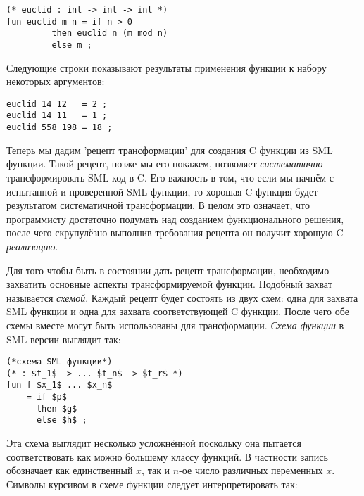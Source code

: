 \begin{lstlisting}[style=customml]
(* euclid : int -> int -> int *)
fun euclid m n = if n > 0
		 then euclid n (m mod n)
		 else m ;
\end{lstlisting}

Следующие строки показывают результаты применения функции  к набору некоторых аргументов:

\begin{lstlisting}[style=customml]
euclid 14 12   = 2 ;
euclid 14 11   = 1 ;
euclid 558 198 = 18 ;
\end{lstlisting}

Теперь мы дадим 'рецепт трансформации' для создания C функции из SML функции. Такой рецепт, позже мы его покажем, позволяет \emph{систематично} трансформировать SML код в C. Его важность в том, что если мы начнём с испытанной и проверенной SML функции, то хорошая C функция будет результатом систематичной трансформации. В целом это означает, что программисту достаточно подумать над созданием функционального решения, после чего скрупулёзно выполнив требования рецепта он получит хорошую C \emph{реализацию}.

Для того чтобы быть в состоянии дать рецепт трансформации, необходимо захватить основные аспекты трансформируемой функции. Подобный захват называется \emph{схемой}. Каждый рецепт будет состоять из двух схем: одна для захвата SML функции и одна для захвата соответствующей C функции. После чего обе схемы вместе могут быть использованы для трансформации. \emph{Схема функции} в SML версии выглядит так:

\begin{lstlisting}[style=customml]
(*схема SML функции*)
(* : $t_1$ -> ... $t_n$ -> $t_r$ *)
fun f $x_1$ ... $x_n$ 
    = if $p$
      then $g$
      else $h$ ;
\end{lstlisting}

Эта схема выглядит несколько усложнённой поскольку она пытается соответствовать как можно большему классу функций. В частности запись  обозначает как единственный $x$, так и $n$-ое число различных переменных $x$. Символы курсивом в схеме функции следует интерпретировать так:

